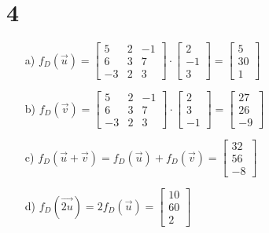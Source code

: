 \documentclass{article}
\begin{document}
\section*{4}
\begin{itemize}
	\item[a) ]	$f_{D}(\vec{u}) 
				=
				\begin{bmatrix}
    			5	&	2	&	-1	\\
    			6	&	3	&	7	\\
    			-3	&	2	&	3
    			\end{bmatrix}   
    			\cdot
    			\begin{bmatrix}
    			2   	\\
   				-1 		\\
   				3		
   				\end{bmatrix}
   				=
				\begin{bmatrix}
    			5 \\
    			30 \\
    			1
    			\end{bmatrix} 				
				$
				
	\item[b) ]	$f_{D}(\vec{v}) 
				=
				\begin{bmatrix}
    			5	&	2	&	-1	\\
    			6	&	3	&	7	\\
    			-3	&	2	&	3
    			\end{bmatrix}   
    			\cdot
    			\begin{bmatrix}
    			2   	\\
   				3 		\\
   				-1		
   				\end{bmatrix}
   				=
				\begin{bmatrix}
    			27   	\\
   				26		\\
   				-9		
   				\end{bmatrix} 				
				$
	\item[c) ]	$f_{D}(\vec{u} + \vec{v})
				=
				f_{D}(\vec{u}) + f_{D}(\vec{v})	=
				\begin{bmatrix}
    			32   	\\
   				56		\\
   				-8		
   				\end{bmatrix} 	
   				$
	\item[d) ]	$f_{D}(\vec{2u})
				=
				2f_{D}(\vec{u})
				=
				\begin{bmatrix}
    			10 \\
    			60 \\
    			2
    			\end{bmatrix}
				$
\end{itemize}
\end{document}
